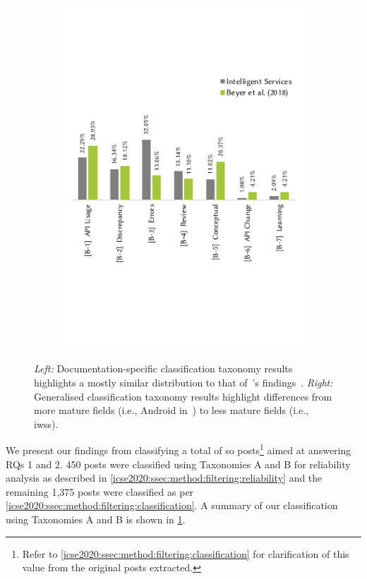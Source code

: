 \begin{figure}[t]
\begin{subfigure}[c]{0.49\linewidth}
    \includegraphics[width=\linewidth]{b-compare.pdf}
  \end{subfigure}
  \caption[Comparing documentation-specific and generalised classifications of Stack Overflow posts]{
    \textit{Left:} Documentation-specific classification taxonomy results highlights a mostly similar distribution to that of~\citeauthor{Aghajani:2019bo}'s findings~\citep{Aghajani:2019bo}.
    \textit{Right:} Generalised classification taxonomy results highlight differences from more mature fields (i.e., Android  in~\citet{Beyer:2018fm}) to less mature fields (i.e., \glspl{iws}).
  }  \label{icse2020:fig:ab-compare}
\end{figure}

We present our findings from classifying a total of \NumPostsCategorised{} \gls{so} posts\footnote{Refer to \cref{icse2020:ssec:method:filtering:classification} for clarification of this value from the original \NumPostsFromSO{} posts extracted.} aimed at answering RQs 1 and 2. 450 posts were classified using Taxonomies A and B for reliability analysis as described in \cref{icse2020:ssec:method:filtering:reliability} and the remaining 1,375 posts were classified as per \cref{icse2020:ssec:method:filtering:classification}. A summary of our classification using Taxonomies A and B is shown in \cref{icse2020:fig:ab-compare}.


